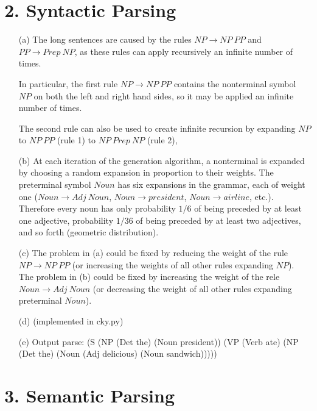\documentclass{article}
\begin{document}
\section*{2. Syntactic Parsing}

\begin{itemize}
    \item[(a)] The long sentences are caused by the rules $NP \to NP \  PP$ and $PP \to Prep \ NP$, as these rules can apply recursively an infinite number of times. 

    In particular, the first rule $NP \to NP \  PP$  contains the nonterminal symbol $NP$ on both the left and right hand sides, so it may be applied an infinite number of times.

    The second rule can also be used to create infinite recursion by expanding $NP$ to $NP \  PP$ (rule 1) to $NP \ Prep \ NP$ (rule 2),

    \item[(b)] At each iteration of the generation algorithm, a nonterminal is expanded by choosing a random expansion in proportion to their weights. The preterminal symbol $Noun$ has six expansions in the grammar, each of weight one ($Noun \to Adj \ Noun$, $Noun \to president$, $Noun \to airline$, etc.). Therefore every noun has only probability $1/6$ of being preceded by at least one adjective, probability $1/36$ of being preceded by at least two adjectives, and so forth (geometric distribution).

    \item[(c)] The problem in (a) could be fixed by reducing the weight of the rule $NP \to NP \  PP$ (or increasing the weights of all other rules expanding $NP$). The problem in (b) could be fixed by increasing the weight of the rele $Noun \to Adj \ Noun$ (or decreasing the weight of all other rules expanding preterminal $Noun$).

    \item[(d)] (implemented in cky.py)

    \item[(e)] Output parse: (S (NP (Det the) (Noun president)) (VP (Verb ate) (NP (Det the) (Noun (Adj delicious) (Noun sandwich)))))

\end{itemize}

\section*{3. Semantic Parsing}
\end{document}
